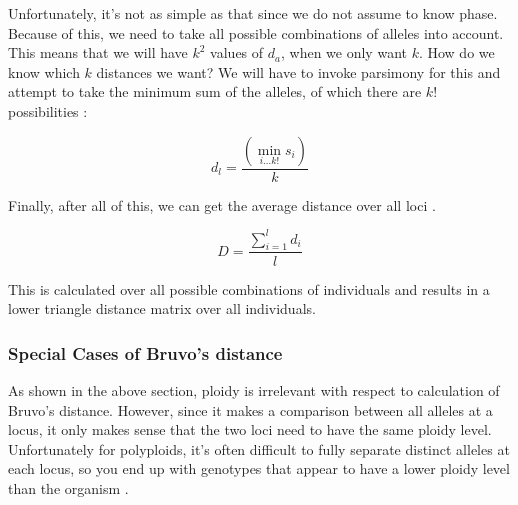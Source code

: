 \documentclass[letterpaper]{article}
\newcommand{\beq}{\begin{equation}}
\newcommand{\eeq}{\end{equation}}
\newcommand{\tab}{\hspace*{1em}}
\begin{document}
Unfortunately, it's not as simple as that since we do not assume to know phase. Because of this, we need to take all possible combinations of alleles into account. This means that we will have $k^2$ values of $d_a$, when we only want $k$. How do we know which $k$ distances we want? We will have to invoke parsimony for this and attempt to take the minimum sum of the alleles, of which there are $k!$ possibilities \cite{Bruvo:2004}:

\beq
\label{eq:d_l}
d_l = \frac{\left(\displaystyle \min_{i \dotsc k!} s_i\right)}{k}
\eeq

Finally, after all of this, we can get the average distance over all loci \cite{Bruvo:2004}. 

\beq
\label{eq:D}
D = \frac{\displaystyle \sum_{i=1}^l d_i}{l}
\eeq

This is calculated over all possible combinations of individuals and results in a lower triangle distance matrix over all individuals. 

\subsubsection{Special Cases of Bruvo's distance}\label{appendix:algorithm:bruvospecial}
\tab\tab As shown in the above section, ploidy is irrelevant with respect to calculation of Bruvo's distance. However, since it makes a comparison between all alleles at a locus, it only makes sense that the two loci need to have the same ploidy level. Unfortunately for polyploids, it's often difficult to fully separate distinct alleles at each locus, so you end up with genotypes that appear to have a lower ploidy level than the organism \cite{Bruvo:2004}. 
\end{document}
